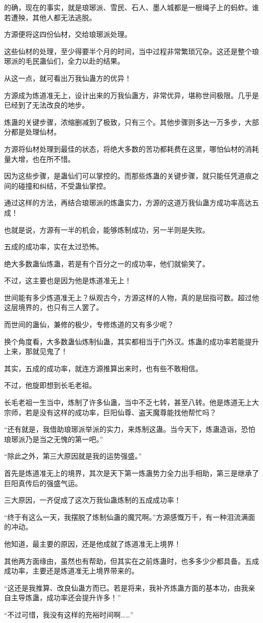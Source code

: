 \begin{this_body}
的确，现在的事实，就是琅琊派、雪民、石人、墨人城都是一根绳子上的蚂蚱。谁若遭殃，其他人都无法逃脱。

方源便将这四份仙材，交给琅琊派处理。

这些仙材的处理，至少得要半个月的时间，当中过程非常繁琐冗杂。这还是整个琅琊派的毛民蛊仙们，全力以赴的结果。

从这一点，就可看出万我仙蛊方的优异！

方源成为炼道准无上，设计出来的万我仙蛊方，非常优异，堪称世间极限。几乎是已经到了无法改良的地步。

炼蛊的关键步骤，浓缩删减到了极致，只有三个。其他步骤则多达一万多步，大部分都是处理仙材。

方源将仙材处理到最佳的状态，将绝大多数的苦功都耗费在这里，哪怕仙材的消耗量大增，也在所不惜。

因为这些步骤，是蛊仙们可以掌控的。而那些炼蛊的关键步骤，就只能任凭道痕之间的碰撞和纠结，不受蛊仙掌控。

通过这样的方法，再结合琅琊派的炼蛊实力，方源的这道万我仙蛊方成功率高达五成！

也就是说，方源有一半的机会，能够炼制成功，另一半则是失败。

五成的成功率，实在太过恐怖。

绝大多数蛊仙炼蛊，若是有个百分之一的成功率，他们就偷笑了。

不过，这主要也是因为他是炼道准无上！

世间能有多少炼道准无上？纵观古今，方源这样的人物，真的是屈指可数。超过他这层境界的，也只有三人罢了。

而世间的蛊仙，兼修的极少，专修炼道的又有多少呢？

换个角度看，大多数蛊仙炼制仙蛊，其实都相当于门外汉。炼蛊的成功率若能提升上来，那就见鬼了！

其实，五成的成功率，就连方源推算出来时，也有些不敢相信。

不过，他旋即想到长毛老祖。

长毛老祖一生当中，炼制了许多仙蛊，当中不乏七转，甚至八转。他是炼道无上大宗师，若是没有这样的成功率，巨阳仙尊、盗天魔尊能找他帮忙吗？

“还有就是，我借助琅琊派举派的实力，来炼制这蛊。当今天下，炼蛊造诣，恐怕琅琊派乃是当之无愧的第一吧。”

“除此之外，第三大原因就是我的运势强盛。”

首先是炼道准无上的境界，其次是天下第一炼蛊势力全力出手相助，第三是继承了巨阳真传后的强盛气运。

三大原因，一齐促成了这次万我仙蛊炼制的五成成功率！

“终于有这么一天，我摆脱了炼制仙蛊的魔咒啊。”方源感慨万千，有一种泪流满面的冲动。

他知道，最主要的原因，还是他成就了炼道准无上境界！

其他两方面缘由，虽然也有帮助，但其实在之前炼蛊时，也多多少少都具备。五成成功率，主要还是炼道准无上境界带来的。

“这还是我推算、改良仙蛊方而已。若是将来，我补齐炼蛊方面的基本功，由我亲自主导炼蛊，成功率还会提升许多！”

“不过可惜，我没有这样的充裕时间啊……”

\end{this_body}

